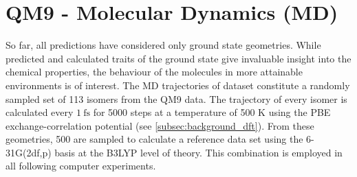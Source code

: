 \section{QM9 -  Molecular Dynamics (MD)}
\label{sec:qm9_md_isomers_benchmark}
So far, all predictions have considered only ground state geometries. While predicted and calculated traits of the ground state give invaluable insight into the chemical properties, the behaviour of the molecules in more attainable environments is of interest. The MD trajectories of  dataset \parencite{ref:qm9_isomers_md} constitute a randomly sampled set of 113 isomers from the QM9  data. The trajectory of every isomer is calculated every $\SI{1}{\femto\second}$ for 5000 steps at a temperature of 500 K using the PBE exchange-correlation potential (see \ref{subsec:background_dft}). From these geometries, 500 are sampled to calculate a reference data set using the 6-31G(2df,p) basis at the B3LYP level of theory. This combination is employed in all following computer experiments. 
\newpage
